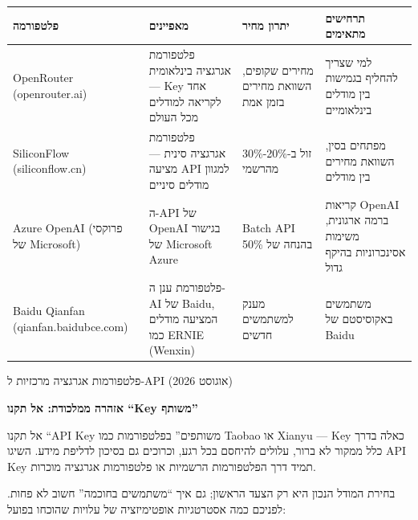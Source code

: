 \begin{center}
\begin{tabularx}{\linewidth}{|X|X|X|X|}
\hline
\textbf{פלטפורמה} & \textbf{מאפיינים} & \textbf{יתרון מחיר} & \textbf{תרחישים מתאימים} \tabularnewline
\hline
OpenRouter (openrouter.ai) & פלטפורמת אגרגציה בינלאומית — Key אחד לקריאה למודלים מכל העולם & מחירים שקופים, השוואת מחירים בזמן אמת & למי שצריך להחליף בגמישות בין מודלים בינלאומיים \tabularnewline
SiliconFlow (siliconflow.cn) & פלטפורמת אגרגציה סינית — מציעה API למגוון מודלים סיניים & זול ב-20\%-30\% מהרשמי & מפתחים בסין, השוואת מחירים בין מודלים \tabularnewline
Azure OpenAI (פרוקסי של Microsoft) & ה-API של OpenAI בגישור של Microsoft Azure & Batch API בהנחה של 50\% & קריאות OpenAI ברמה ארגונית, משימות אסינכרוניות בהיקף גדול \tabularnewline
Baidu Qianfan (qianfan.baidubce.com) & פלטפורמת ענן ה-AI של Baidu, המציעה מודלים כמו ERNIE (Wenxin) & מענק למשתמשים חדשים & משתמשים באקוסיסטם של Baidu \tabularnewline
\hline
\end{tabularx}
\end{center}

\begin{center}\small\color{gray}פלטפורמות אגרגציה מרכזיות ל-API (אוגוסט 2026)\end{center}

\textbf{אזהרה ממלכודת: אל תקנו “Key משותף”}\par

אל תקנו “API Key משותפים” בפלטפורמות כמו Taobao או Xianyu — Key כאלה בדרך כלל ממקור לא ברור, עלולים להיחסם בכל רגע, וכרוכים גם בסיכון לדליפת מידע. השיגו API Key תמיד דרך הפלטפורמות הרשמיות או פלטפורמות אגרגציה מוכרות.


בחירת המודל הנכון היא רק הצעד הראשון; גם איך “משתמשים בחוכמה” חשוב לא פחות. לפניכם כמה אסטרטגיות אופטימיזציה של עלויות שהוכחו בפועל:

